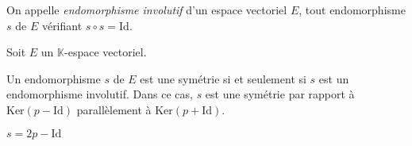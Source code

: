 \documentclass[a4paper,10pt]{report}
\begin{document}
\begin{preuve}
\vspace{8cm}
\newpage
\phantom{test}

\vspace{1.5cm}
\end{preuve}

\begin{defin} On appelle \textit{endomorphisme involutif} d'un espace vectoriel $E$, tout endomorphisme $s$ de $E$ vérifiant \newline $s \circ s = \textrm{Id}$.
\end{defin}

\begin{prop} Soit $E$ un $\mathbb{K}$-espace vectoriel.

\noindent Un endomorphisme $s$ de $E$ est une symétrie si et seulement si $s$ est un endomorphisme involutif. Dans ce cas, $s$ est une symétrie par rapport à $\textrm{Ker}(p-\textrm{Id})$ parallèlement à $\textrm{Ker}(p+\textrm{Id})$.
\end{prop}

\vspace{11cm}

\begin{retenir} $s=2p-\textrm{Id}$
\end{retenir}
\end{document}
